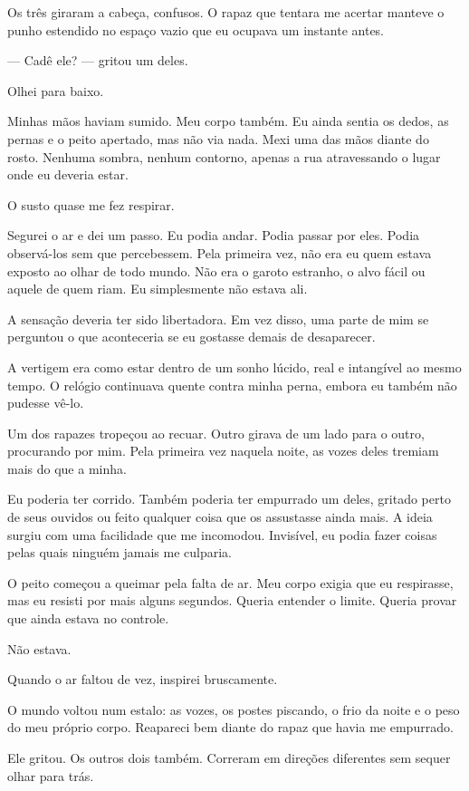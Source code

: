 Os três giraram a cabeça, confusos. O rapaz que tentara me acertar manteve o punho estendido no espaço vazio que eu ocupava um instante antes.

— Cadê ele? — gritou um deles.

Olhei para baixo.

Minhas mãos haviam sumido. Meu corpo também. Eu ainda sentia os dedos, as pernas e o peito apertado, mas não via nada. Mexi uma das mãos diante do rosto. Nenhuma sombra, nenhum contorno, apenas a rua atravessando o lugar onde eu deveria estar.

O susto quase me fez respirar.

Segurei o ar e dei um passo. Eu podia andar. Podia passar por eles. Podia observá-los sem que percebessem. Pela primeira vez, não era eu quem estava exposto ao olhar de todo mundo. Não era o garoto estranho, o alvo fácil ou aquele de quem riam. Eu simplesmente não estava ali.

A sensação deveria ter sido libertadora. Em vez disso, uma parte de mim se perguntou o que aconteceria se eu gostasse demais de desaparecer.

A vertigem era como estar dentro de um sonho lúcido, real e intangível ao mesmo tempo. O relógio continuava quente contra minha perna, embora eu também não pudesse vê-lo.

Um dos rapazes tropeçou ao recuar. Outro girava de um lado para o outro, procurando por mim. Pela primeira vez naquela noite, as vozes deles tremiam mais do que a minha.

Eu poderia ter corrido. Também poderia ter empurrado um deles, gritado perto de seus ouvidos ou feito qualquer coisa que os assustasse ainda mais. A ideia surgiu com uma facilidade que me incomodou. Invisível, eu podia fazer coisas pelas quais ninguém jamais me culparia.

O peito começou a queimar pela falta de ar. Meu corpo exigia que eu respirasse, mas eu resisti por mais alguns segundos. Queria entender o limite. Queria provar que ainda estava no controle.

Não estava.

Quando o ar faltou de vez, inspirei bruscamente.

O mundo voltou num estalo: as vozes, os postes piscando, o frio da noite e o peso do meu próprio corpo. Reapareci bem diante do rapaz que havia me empurrado.

Ele gritou. Os outros dois também. Correram em direções diferentes sem sequer olhar para trás.


